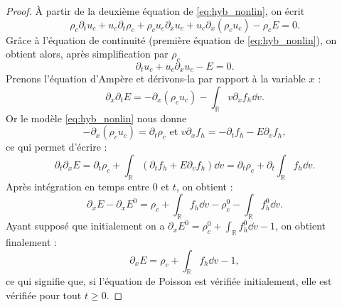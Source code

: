\begin{proof}
  À partir de la deuxième équation de \eqref{eq:hyb_nonlin}, on écrit 
  $$
    \rho_c \partial_t u_c + u_c\partial_t \rho_c + \rho_c u_c\partial_x u_c + u_c  \partial_x (\rho_c u_c) - \rho_c E=0. 
  $$
  Grâce à l'équation de continuité (première équation de \eqref{eq:hyb_nonlin}), on obtient alors, après simplification par $\rho_c$  
  $$
    \partial_t u_c +  u_c\partial_x u_c - E=0. 
  $$
  Prenons l'équation d'Ampère et dérivons-la par rapport à la variable $x$ :
  $$
    \partial_x\partial_t E = -\partial_x(\rho_cu_c) - \int_{\mathbb{R}} v\partial_x f_h \dd{v}.
  $$
  Or le modèle \eqref{eq:hyb_nonlin} nous donne  
  $$
    -\partial_x(\rho_cu_c) = \partial_t\rho_c \mbox{ et } v\partial_xf_h = -\partial_tf_h - E\partial_vf_h, 
  $$ 
  ce qui permet d'écrire :
  $$
    \partial_t\partial_x E = \partial_t\rho_c + \int_{\mathbb{R}} (\partial_tf_h + E\partial_vf_h) \dd{v} = \partial_t\rho_c + \partial_t \int_{\mathbb{R}}  f_h \dd{v} .
  $$
  Après intégration en temps entre $0$ et $t$, on obtient :
  $$
    \partial_x E - \partial_xE^0 = \rho_c + \int_{\mathbb{R}} f_h \dd{v} - \rho_c^0 - \int_{\mathbb{R}} f_h^0 \dd{v}.
  $$
  Ayant supposé que initialement on a $\partial_xE^0 = \rho_c^0 + \int_{\mathbb{R}} f_h^0 \dd{v} -1$, on obtient finalement :
  $$
    \partial_x E = \rho_c + \int_{\mathbb{R}} f_h \dd{v} - 1,
  $$
  ce qui signifie que, si l'équation de Poisson est vérifiée initialement, elle est vérifiée pour tout $t\geq 0$.
\end{proof}

